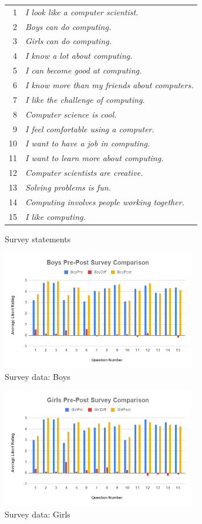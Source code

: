 \begin{figure}
{\small
\begin{tabular}{rl}
1 & \textit{I look like a computer scientist.} \\
2 & \textit{Boys can do computing.} \\
3 & \textit{Girls can do computing.} \\
4 & \textit{I know a lot about computing.} \\
5 & \textit{I can become good at computing.} \\
6 & \textit{I know more than my friends about computers.} \\
7 & \textit{I like the challenge of computing.} \\
8 & \textit{Computer science is cool.} \\
9 & \textit{I feel comfortable using a computer.} \\
10 & \textit{I want to have a job in computing.} \\
11 & \textit{I want to learn more about computing.} \\
12 & \textit{Computer scientists are creative.} \\
13 & \textit{Solving problems is fun.} \\
14 & \textit{Computing involves people working together.} \\
15 & \textit{I like computing.} 
\end{tabular}
}
\caption{Survey statements}
\label{figure:survey}
\end{figure}

\begin{figure}
\includegraphics[width=3.3in]{images/boys}
\caption{Survey data: Boys}
\label{figure:boys}
\end{figure}

\begin{figure}
\includegraphics[width=3.3in]{images/girls}
\caption{Survey data: Girls}
\label{figure:girls}
\end{figure}

